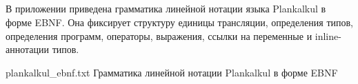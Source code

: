 \begin{appendices}
	\chapter{}
	В приложении приведена грамматика линейной нотации языка Plankalkul в форме EBNF.
	Она фиксирует структуру единицы трансляции, определения типов, определения программ, операторы, выражения, ссылки на переменные и inline-аннотации типов.

	{plankalkul_ebnf.txt}
	{Грамматика линейной нотации Plankalkul в форме EBNF}
\end{appendices}
